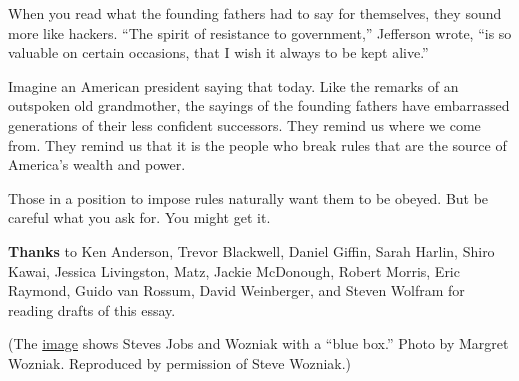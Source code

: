 When you read what the founding fathers had to say for themselves, they
sound more like hackers. ``The spirit of resistance to government,''
Jefferson wrote, ``is so valuable on certain occasions, that I wish it
always to be kept alive.''

Imagine an American president saying that today. Like the remarks of an
outspoken old grandmother, the sayings of the founding fathers have
embarrassed generations of their less confident successors. They remind
us where we come from. They remind us that it is the people who break
rules that are the source of America's wealth and power.

Those in a position to impose rules naturally want them to be obeyed.
But be careful what you ask for. You might get it.

\textbf{Thanks} to Ken Anderson, Trevor Blackwell, Daniel Giffin, Sarah
Harlin, Shiro Kawai, Jessica Livingston, Matz, Jackie McDonough, Robert
Morris, Eric Raymond, Guido van Rossum, David Weinberger, and Steven
Wolfram for reading drafts of this essay.

(The \href{bluebox.html}{image} shows Steves Jobs and Wozniak with a
``blue box.'' Photo by Margret Wozniak. Reproduced by permission of
Steve Wozniak.)

